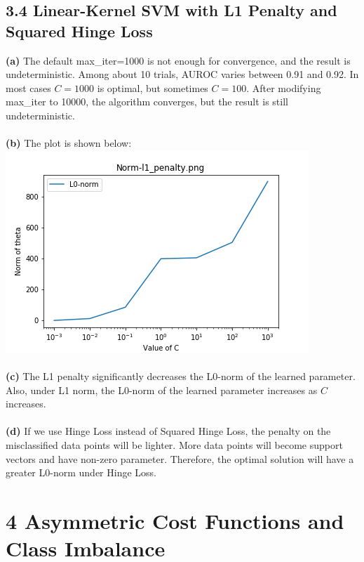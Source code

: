 \documentclass{article}
\begin{document}
\subsection*{3.4 Linear-Kernel SVM with L1 Penalty and Squared Hinge Loss}
\textbf{(a)} The default max\_iter=1000 is not enough for convergence, and the result is undeterministic.
Among about 10 trials, AUROC varies between 0.91 and 0.92. In most cases $C=1000$ is optimal, but sometimes $C=100$.
After modifying max\_iter to 10000, the algorithm converges, but the result is still undeterministic. \\\\
\textbf{(b)} The plot is shown below:\\
\includegraphics[width=.5\textwidth]{34b.png}\\\\
\textbf{(c)} The L1 penalty significantly decreases the L0-norm of the learned parameter.
Also, under L1 norm, the L0-norm of the learned parameter increases as $C$ increases.\\\\
\textbf{(d)} If we use Hinge Loss instead of Squared Hinge Loss, the penalty on the misclassified data points will be lighter.
More data points will become support vectors and have non-zero parameter.
Therefore, the optimal solution will have a greater L0-norm under Hinge Loss.\\
\section*{4 Asymmetric Cost Functions and Class Imbalance}
\end{document}
